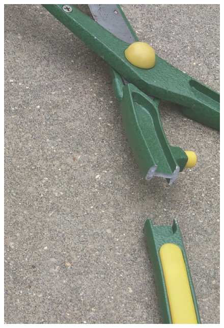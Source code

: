\documentclass[12pt, oneside]{article}
\begin{document}
\begin{enumerate}
\begin{figure}[H]
		\end{figure}
		\begin{figure}[H]
			\centering
			\includegraphics[width=0.4\linewidth]{c6-4b}
		\end{figure}
\end{enumerate}
\end{document}
